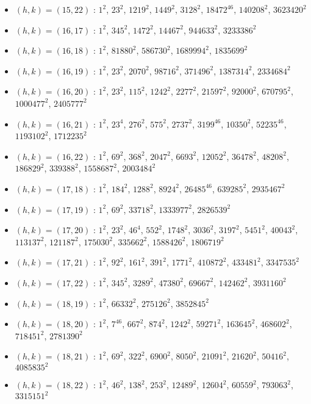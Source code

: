 \begin{itemize}
\item $(h,k)=(15,22)$ : $1^{2}$, $23^{2}$, $1219^{2}$, $1449^{2}$, $3128^{2}$, $18472^{46}$, $140208^{2}$, $3623420^{2}$
\item $(h,k)=(16,17)$ : $1^{2}$, $345^{2}$, $1472^{2}$, $14467^{2}$, $944633^{2}$, $3233386^{2}$
\item $(h,k)=(16,18)$ : $1^{2}$, $81880^{2}$, $586730^{2}$, $1689994^{2}$, $1835699^{2}$
\item $(h,k)=(16,19)$ : $1^{2}$, $23^{2}$, $2070^{2}$, $98716^{2}$, $371496^{2}$, $1387314^{2}$, $2334684^{2}$
\item $(h,k)=(16,20)$ : $1^{2}$, $23^{2}$, $115^{2}$, $1242^{2}$, $2277^{2}$, $21597^{2}$, $92000^{2}$, $670795^{2}$, $1000477^{2}$, $2405777^{2}$
\item $(h,k)=(16,21)$ : $1^{2}$, $23^{4}$, $276^{2}$, $575^{2}$, $2737^{2}$, $3199^{46}$, $10350^{2}$, $52235^{46}$, $1193102^{2}$, $1712235^{2}$
\item $(h,k)=(16,22)$ : $1^{2}$, $69^{2}$, $368^{2}$, $2047^{2}$, $6693^{2}$, $12052^{2}$, $36478^{2}$, $48208^{2}$, $186829^{2}$, $339388^{2}$, $1558687^{2}$, $2003484^{2}$
\item $(h,k)=(17,18)$ : $1^{2}$, $184^{2}$, $1288^{2}$, $8924^{2}$, $26485^{46}$, $639285^{2}$, $2935467^{2}$
\item $(h,k)=(17,19)$ : $1^{2}$, $69^{2}$, $33718^{2}$, $1333977^{2}$, $2826539^{2}$
\item $(h,k)=(17,20)$ : $1^{2}$, $23^{2}$, $46^{4}$, $552^{2}$, $1748^{2}$, $3036^{2}$, $3197^{2}$, $5451^{2}$, $40043^{2}$, $113137^{2}$, $121187^{2}$, $175030^{2}$, $335662^{2}$, $1588426^{2}$, $1806719^{2}$
\item $(h,k)=(17,21)$ : $1^{2}$, $92^{2}$, $161^{2}$, $391^{2}$, $1771^{2}$, $410872^{2}$, $433481^{2}$, $3347535^{2}$
\item $(h,k)=(17,22)$ : $1^{2}$, $345^{2}$, $3289^{2}$, $47380^{2}$, $69667^{2}$, $142462^{2}$, $3931160^{2}$
\item $(h,k)=(18,19)$ : $1^{2}$, $66332^{2}$, $275126^{2}$, $3852845^{2}$
\item $(h,k)=(18,20)$ : $1^{2}$, $7^{46}$, $667^{2}$, $874^{2}$, $1242^{2}$, $59271^{2}$, $163645^{2}$, $468602^{2}$, $718451^{2}$, $2781390^{2}$
\item $(h,k)=(18,21)$ : $1^{2}$, $69^{2}$, $322^{2}$, $6900^{2}$, $8050^{2}$, $21091^{2}$, $21620^{2}$, $50416^{2}$, $4085835^{2}$
\item $(h,k)=(18,22)$ : $1^{2}$, $46^{2}$, $138^{2}$, $253^{2}$, $12489^{2}$, $12604^{2}$, $60559^{2}$, $793063^{2}$, $3315151^{2}$

\end{itemize}

